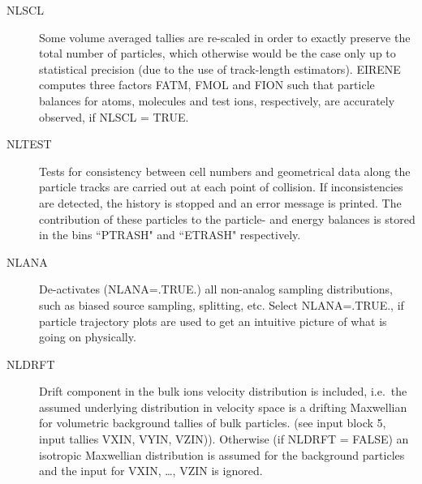 \begin{description}
  \item[NLSCL] Some volume averaged tallies are re-scaled in order to exactly
        preserve the total number of particles, which otherwise would be the case only
        up to statistical precision (due to the use of track-length estimators).
        EIRENE computes three factors FATM, FMOL and FION such that particle balances
        for atoms, molecules and test ions, respectively, are accurately observed, if
        NLSCL = TRUE.
  \item[NLTEST] Tests for consistency between cell numbers and geometrical data
        along the particle tracks are carried out at each point of collision.
        If inconsistencies are detected, the history is stopped and an error message is
        printed.
        The contribution of these particles to the particle- and energy balances is
        stored in the bins ``PTRASH" and ``ETRASH" respectively.
  \item[NLANA] De-activates (NLANA=.TRUE.) all non-analog sampling distributions, such
        as biased source sampling, splitting, etc.
        Select NLANA=.TRUE., if particle trajectory plots are used to get an intuitive
        picture of what is going on physically.
  \item[NLDRFT] Drift component in the bulk ions velocity distribution is
        included, i.e.\ the assumed underlying distribution in velocity space is a
        drifting Maxwellian for volumetric background tallies of bulk particles.
        (see input block 5, input tallies VXIN, VYIN, VZIN)).
        Otherwise (if NLDRFT = FALSE) an isotropic Maxwellian distribution is assumed
        for the background particles and the input for VXIN, \dots, VZIN is ignored.


\end{description}
